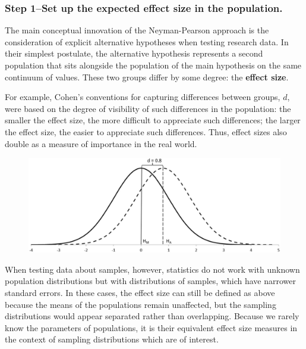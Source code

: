 \documentclass[
]{book}
\theoremstyle{definition}
\theoremstyle{definition}
\theoremstyle{definition}
\theoremstyle{definition}
\theoremstyle{remark}
\begin{document}
\hypertarget{step-1set-up-the-expected-effect-size-in-the-population.}{%
\subsubsection*{Step 1--Set up the expected effect size in the population.}\label{step-1set-up-the-expected-effect-size-in-the-population.}}

The main conceptual innovation of the Neyman-Pearson approach is the consideration of explicit alternative hypotheses when testing research data. In their simplest postulate, the alternative hypothesis represents a second population that sits alongside the population of the main hypothesis on the same continuum of values. These two groups differ by some degree: the \textbf{effect size}.

For example, Cohen's \citeyearpar{Cohen88} conventions for capturing differences between groups, \(d\), were based on the degree of visibility of such differences in the population: the smaller the effect size, the more difficult to appreciate such differences; the larger the effect size, the easier to appreciate such differences. Thus, effect sizes also double as a measure of importance in the real world.

\begin{figure}

{\centering \includegraphics[width=0.6\linewidth]{images/Perezgonzalez2015Fig2} 

}

\end{figure}

When testing data about samples, however, statistics do not work with unknown population distributions but with distributions of samples, which have narrower standard errors. In these cases, the effect size can still be defined as above because the means of the populations remain unaffected, but the sampling distributions would appear separated rather than overlapping. Because we rarely know the parameters of populations, it is their equivalent effect size measures in the context of sampling distributions which are of interest.
\end{document}

